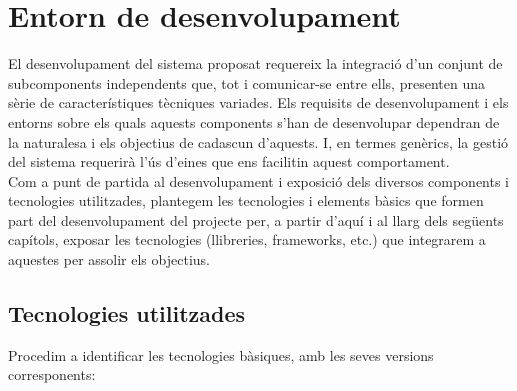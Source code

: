 
\chapter{Entorn de desenvolupament} %

\label{EinesDesenvolupament} %

El desenvolupament del sistema proposat requereix la integració d'un conjunt de subcomponents independents que, tot i comunicar-se entre ells, presenten una sèrie de característiques tècniques variades. Els requisits de desenvolupament i els entorns sobre els quals aquests components s'han de desenvolupar dependran de la naturalesa i els objectius de cadascun d'aquests. I, en termes genèrics, la gestió del sistema requerirà l'ús d'eines que ens facilitin aquest comportament.\\

Com a punt de partida al desenvolupament i exposició dels diversos components i tecnologies utilitzades, plantegem les tecnologies i elements bàsics que formen part del desenvolupament del projecte per, a partir d'aquí i al llarg dels següents capítols, exposar les tecnologies (llibreries, frameworks, etc.) que integrarem a aquestes per assolir els objectius.

\section{Tecnologies utilitzades}

Procedim a identificar les tecnologies bàsiques, amb les seves versions corresponents:

